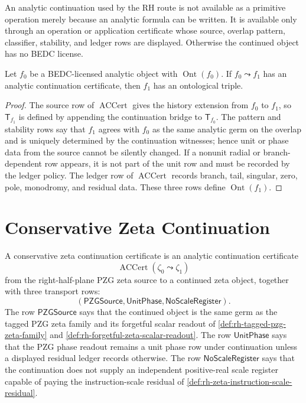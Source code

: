 \begin{principle}
\label{prin:rh-no-uncertified-analytic-continuation}
An analytic continuation used by the RH route is not available as a
primitive operation merely because an analytic formula can be written.
It is available only through an operation or application certificate
whose source, overlap pattern, classifier, stability, and ledger rows
are displayed.  Otherwise the continued object has no BEDC license.
\end{principle}

\begin{theorem}
\label{thm:rh-certified-continuation-preserves-ontological-triple}
Let $f_0$ be a BEDC-licensed analytic object with
$\operatorname{Ont}(f_0)$.  If $f_0\leadsto f_1$ has an analytic
continuation certificate, then $f_1$ has an ontological triple.
\end{theorem}

\begin{proof}
The source row of $\operatorname{ACCert}$ gives the history extension
from $f_0$ to $f_1$, so $\mathsf T_{f_1}$ is defined by appending the
continuation bridge to $\mathsf T_{f_0}$.  The pattern and stability
rows say that $f_1$ agrees with $f_0$ as the same analytic germ on the
overlap and is uniquely determined by the continuation witnesses; hence
unit or phase data from the source cannot be silently changed.  If a
nonunit radial or branch-dependent row appears, it is not part of the
unit row and must be recorded by the ledger policy.  The ledger row of
$\operatorname{ACCert}$ records branch, tail, singular, zero, pole,
monodromy, and residual data.  These three rows define
$\operatorname{Ont}(f_1)$.
\end{proof}

\section{Conservative Zeta Continuation}
\label{sec:rh-conservative-zeta-continuation}

\begin{definition}
\label{def:rh-conservative-zeta-continuation-certificate}
A conservative zeta continuation certificate is an analytic continuation
certificate
$$
\operatorname{ACCert}(\zeta_0\leadsto\zeta_1)
$$
from the right-half-plane PZG zeta source to a continued zeta object,
together with three transport rows:
$$
(\mathsf{PZGSource},\mathsf{UnitPhase},\mathsf{NoScaleRegister}).
$$
The row $\mathsf{PZGSource}$ says that the continued object is the same
germ as the tagged PZG zeta family and its forgetful scalar readout of
\autoref{def:rh-tagged-pzg-zeta-family} and
\autoref{def:rh-forgetful-zeta-scalar-readout}.  The row
$\mathsf{UnitPhase}$ says that the PZG phase readout remains a unit
phase row under continuation unless a displayed residual ledger records
otherwise.  The row $\mathsf{NoScaleRegister}$ says that the continuation
does not supply an independent positive-real scale register capable of
paying the instruction-scale residual of
\autoref{def:rh-zeta-instruction-scale-residual}.
\end{definition}

